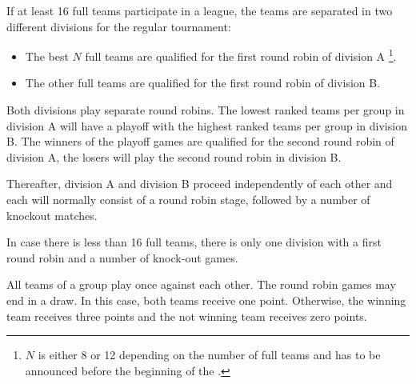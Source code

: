   \bigskip
  

  If at least 16 full teams participate in a league,
  the teams are separated in two different divisions for the regular tournament:
  \begin{itemize}
  \item The best $N$ full teams are qualified for the first round robin of division A
    \footnote{$N$ is either 8 or 12 depending on the number of full teams and
      has to be announced before the beginning of the  .}.
  \item The other full teams are qualified for the first round robin of division B.
  \end{itemize}
  

  Both divisions play separate round robins. 
  The lowest ranked teams per group in division A will have a playoff
  with the highest ranked teams per group in division B.
  The winners of the playoff games are qualified for the second round robin of
  division A, the losers will play the second round robin in
  division B.
  
  Thereafter, division A and division B proceed independently of each other and 
  each will normally consist of a round robin stage, followed by a number of knockout matches. 

  
  \bigskip

  In case there is less than 16 full teams, there is only one division with a
  first round robin and a number of knock-out games.

\bigskip

All teams of a group play once against each other.
The round robin games may end in a draw.
In this case, both teams receive one point.
Otherwise, the winning team receives three points and the not winning team
receives zero points.

\bigskip

